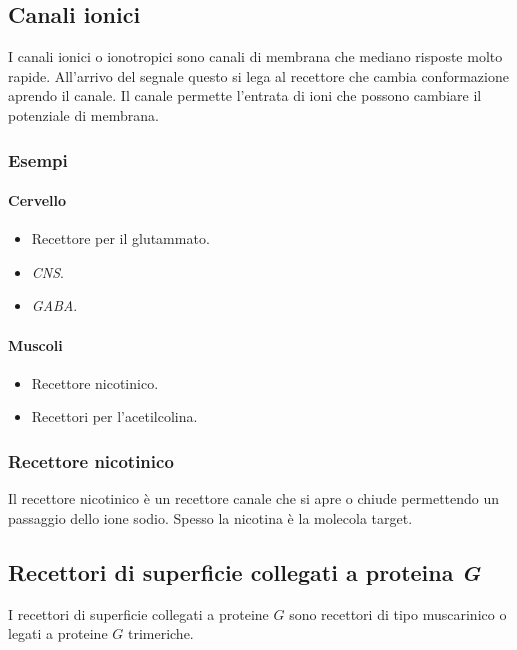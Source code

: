	\subsection{Canali ionici}
	I canali ionici o ionotropici sono canali di membrana che mediano risposte molto rapide.
	All'arrivo del segnale questo si lega al recettore che cambia conformazione aprendo il canale.
	Il canale permette l'entrata di ioni che possono cambiare il potenziale di membrana.

		\subsubsection{Esempi}

			\paragraph{Cervello}
			\begin{multicols}{2}
				\begin{itemize}
					\item Recettore per il glutammato.
					\item \emph{CNS}.
					\item \emph{GABA}.
				\end{itemize}
			\end{multicols}

			\paragraph{Muscoli}
			\begin{multicols}{2}
				\begin{itemize}
					\item Recettore nicotinico.
					\item Recettori per l'acetilcolina.
				\end{itemize}
			\end{multicols}
		
		\subsubsection{Recettore nicotinico}
		Il recettore nicotinico \`e un recettore canale che si apre o chiude permettendo un passaggio dello ione sodio.
		Spesso la nicotina \`e la molecola target.

	\subsection{Recettori di superficie collegati a proteina \emph{G}}
	I recettori di superficie collegati a proteine $G$ sono recettori di tipo muscarinico o legati a proteine $G$ trimeriche.

